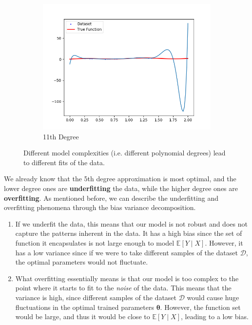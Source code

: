 \documentclass{article}
\theoremstyle{definition}
\begin{document}
\begin{figure}[hbt!]
\begin{subfigure}[b]{0.32\textwidth}
          \includegraphics[width=\textwidth]{img/poly_11_fit.png}
          \caption{11th Degree}
          \label{fig:11e}
        \end{subfigure}

        \caption{Different model complexities (i.e. different polynomial degrees) lead to different fits of the data. }
        \label{fig:polynomial_fitting}    
      \end{figure}

      We already know that the 5th degree approximation is most optimal, and the lower degree ones are \textbf{underfitting} the data, while the higher degree ones are \textbf{overfitting}. As mentioned before, we can describe the underfitting and overfitting phenomena through the bias variance decomposition. 

      \begin{enumerate}
        \item If we underfit the data, this means that our model is not robust and does not capture the patterns inherent in the data. It has a high bias since the set of function it encapsulates is not large enough to model $\mathbb{E}[Y\mid X]$. However, it has a low variance since if we were to take different samples of the dataset $\mathcal{D}$, the optimal parameters would not fluctuate. 

        \item What overfitting essentially means is that our model is too complex to the point where it starts to fit to the \textit{noise} of the data. This means that the variance is high, since different samples of the dataset $\mathcal{D}$ would cause huge fluctuations in the optimal trained parameters $\boldsymbol{\theta}$. However, the function set would be large, and thus it would be close to $\mathbb{E}[Y \mid X]$, leading to a low bias. 
      \end{enumerate}
\end{document}
